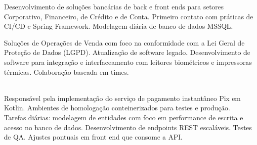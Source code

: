 \documentclass[10pt,a4paper,ragged2e]{altacv}
\begin{document}

\begin{fullwidth}
\makecvheader
\end{fullwidth}

Desenvolvimento de soluções bancárias de back e front ends para setores Corporativo, Financeiro, de Crédito e de Conta. Primeiro contato com práticas de CI/CD e Spring Framework. Modelagem diária de banco de dados MSSQL.
\\


\divider

Soluções de Operações de Venda com foco na conformidade com a Lei Geral de Proteção de Dados (LGPD). Atualização de software legado. Desenvolvimento de software para integração e interfaceamento com leitores biométricos e impressoras térmicas. Colaboração baseada em times.
\\

\\

\divider

Responsável pela implementação do serviço de pagamento instantâneo Pix em Kotlin. Ambientes de homologação conteinerizados para testes e produção. Tarefas diárias: modelagem de entidades com foco em performance de escrita e acesso no banco de dados. Desenvolvimento de endpoints REST escaláveis. Testes de QA. Ajustes pontuais em front end que consome a API.
\\
\end{document}
